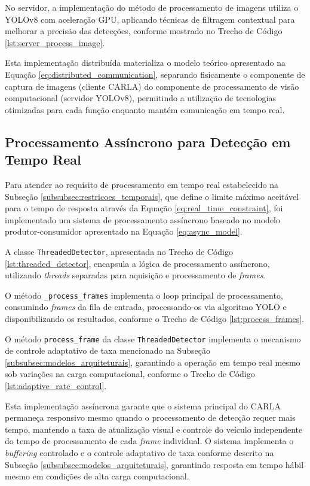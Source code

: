 No servidor, a implementação do método de processamento de imagens utiliza o YOLOv8 com aceleração GPU, aplicando técnicas de filtragem contextual para melhorar a precisão das detecções, conforme mostrado no Trecho de Código \ref{lst:server_process_image}.

Esta implementação distribuída materializa o modelo teórico apresentado na Equação \ref{eq:distributed_communication}, separando fisicamente o componente de captura de imagens (cliente CARLA) do componente de processamento de visão computacional (servidor YOLOv8), permitindo a utilização de tecnologias otimizadas para cada função enquanto mantém comunicação em tempo real.

\subsection{Processamento Assíncrono para Detecção em Tempo Real} \label{subsec:implementacao_processamento_assincrono}

Para atender ao requisito de processamento em tempo real estabelecido na Subseção \ref{subsubsec:restricoes_temporais}, que define o limite máximo aceitável para o tempo de resposta através da Equação \ref{eq:real_time_constraint}, foi implementado um sistema de processamento assíncrono baseado no modelo produtor-consumidor apresentado na Equação \ref{eq:async_model}.

A classe \texttt{ThreadedDetector}, apresentada no Trecho de Código \ref{lst:threaded_detector}, encapsula a lógica de processamento assíncrono, utilizando \textit{threads} separadas para aquisição e processamento de \textit{frames}.

O método \texttt{\_process\_frames} implementa o loop principal de processamento, consumindo \textit{frames} da fila de entrada, processando-os via algoritmo YOLO e disponibilizando os resultados, conforme o Trecho de Código \ref{lst:process_frames}.

O método \texttt{process\_frame} da classe \texttt{ThreadedDetector} implementa o mecanismo de controle adaptativo de taxa mencionado na Subseção \ref{subsubsec:modelos_arquiteturais}, garantindo a operação em tempo real mesmo sob variações na carga computacional, conforme o Trecho de Código \ref{lst:adaptive_rate_control}.

Esta implementação assíncrona garante que o sistema principal do CARLA permaneça responsivo mesmo quando o processamento de detecção requer mais tempo, mantendo a taxa de atualização visual e controle do veículo independente do tempo de processamento de cada \textit{frame} individual. O sistema implementa o \textit{buffering} controlado e o controle adaptativo de taxa conforme descrito na Subseção \ref{subsubsec:modelos_arquiteturais}, garantindo resposta em tempo hábil mesmo em condições de alta carga computacional.

